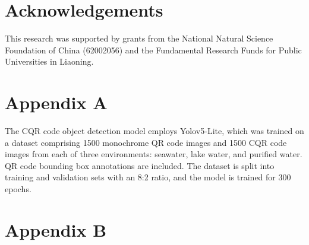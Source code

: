 \documentclass[preprint,12pt]{elsarticle}
\begin{document}


\section*{Acknowledgements}
This research was supported by grants from the National Natural Science Foundation of China (62002056) and the Fundamental Research Funds for Public Universities in Liaoning.






\section*{Appendix A}
The CQR code object detection model employs Yolov5-Lite, which was trained on a dataset comprising 1500 monochrome QR code images and 1500 CQR code images from each of three environments: seawater, lake water, and purified water. QR code bounding box annotations are included. The dataset is split into training and validation sets with an 8:2 ratio, and the model is trained for 300 epochs.

\section*{Appendix B}
\setcounter{table}{0} %
\renewcommand{\thetable}{B.\arabic{table}}

\end{document}
